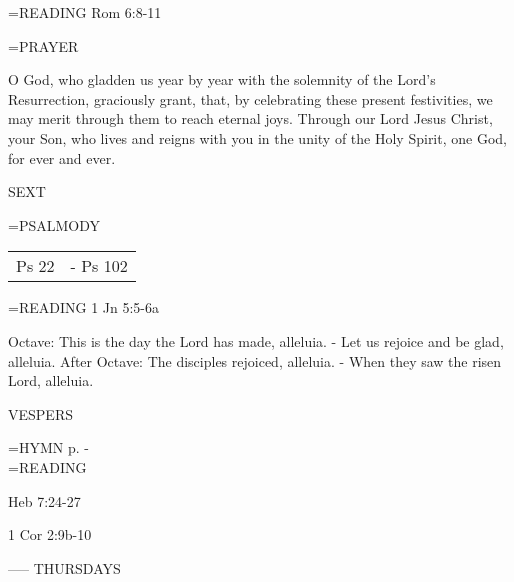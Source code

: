\hangindent=\parindent \small{\uppercase{READING}}    Rom 6:8-11 \textbf{   \\}

\hangindent=\parindent \small PRAYER
\begin{description}[labelindent=\parindent, leftmargin=*]
\item [Octave:] 	O God, who gladden us year by year with the solemnity of the Lord's Resurrection, graciously grant, that, by celebrating these present festivities, we may merit through them to reach eternal joys. Through our Lord Jesus Christ, your Son, who lives and reigns with you in the unity of the Holy Spirit, one God, for ever and ever.
\item [After Octave:] 	
\end{description}

\begin{flushleft}\normalsize SEXT\\\end{flushleft}
\hangindent=\parindent \small{PSALMODY}
\begin{center}
\begin{tabular}{ l l }
Ps 22 &  - Ps 102\\
\end{tabular}
\end{center}		

\hangindent=\parindent \small{\uppercase{READING}}    1 Jn 5:5-6a \textbf{   \\}

Octave:	This is the day the Lord has made, alleluia.
		- Let us rejoice and be glad, alleluia.
After Octave:	The disciples rejoiced, alleluia.
		- When they saw the risen Lord, alleluia.

\begin{flushleft}\normalsize VESPERS\\\end{flushleft}
\hangindent=\parindent \small{\uppercase{HYMN} p. \pageref{easter:firstHymn}-\pageref{easter:lastHymn}\\}
\hangindent=\parindent \small READING
\begin{description}[labelindent=\parindent, leftmargin=*]
\item [1st-6th Week:]     Heb 7:24-27 \textbf{    \\}
\item [7th Week:]     1 Cor 2:9b-10 \textbf{    \\}
\end{description}

-----
THURSDAYS

